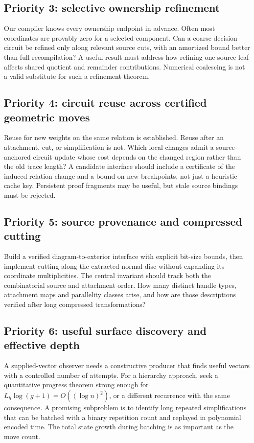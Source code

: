 \documentclass[11pt]{article}
\theoremstyle{definition}\newtheorem{definition}[theorem]{Definition}
\theoremstyle{remark}\newtheorem{remark}[theorem]{Remark}
\begin{document}
\subsection{Priority 3: selective ownership refinement}
Our compiler knows every ownership endpoint in advance. Often most coordinates
are provably zero for a selected component. Can a coarse decision circuit be
refined only along relevant source cuts, with an amortized bound better than full
recompilation? A useful result must address how refining one source leaf affects
shared quotient and remainder contributions. Numerical coalescing is not a valid
substitute for such a refinement theorem.

\subsection{Priority 4: circuit reuse across certified geometric moves}
Reuse for new weights on the same relation is established. Reuse after an
attachment, cut, or simplification is not. Which local changes admit a
source-anchored circuit update whose cost depends on the changed region rather
than the old trace length? A candidate interface should include a certificate of
the induced relation change and a bound on new breakpoints, not just a heuristic
cache key. Persistent proof fragments may be useful, but stale source bindings
must be rejected.

\subsection{Priority 5: source provenance and compressed cutting}
Build a verified diagram-to-exterior interface with explicit bit-size bounds,
then implement cutting along the extracted normal disc without expanding its
coordinate multiplicities. The central invariant should track both the
combinatorial source and attachment order. How many distinct handle types,
attachment maps and parallelity classes arise, and how are those descriptions
verified after long compressed transformations?

\subsection{Priority 6: useful surface discovery and effective depth}
A supplied-vector observer needs a constructive producer that finds useful
vectors with a controlled number of attempts. For a hierarchy approach, seek a
quantitative progress theorem strong enough for
$L_h\log(g+1)=O((\log n)^2)$, or a different recurrence with the same consequence.
A promising subproblem is to identify long repeated simplifications that can be
batched with a binary repetition count and replayed in polynomial encoded time.
The total state growth during batching is as important as the move count.
\end{document}
